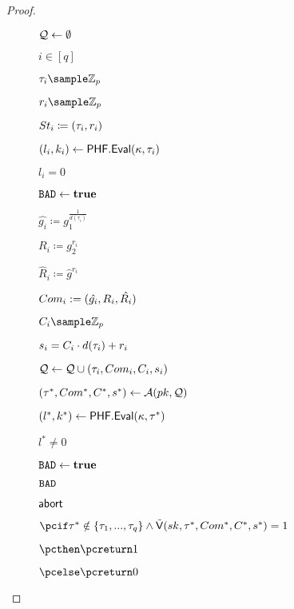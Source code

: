 \begin{proof}
\begin{figure}[htb!]
{\begin{minipage}{1\textwidth}
\begin{nicodemus}
		\item $\mathcal{Q} \leftarrow \emptyset$
                \item \pcfor $i \in [q]$
                \item \quad $ \tau_i \sample \mathbb{Z}_p$
                \hfill{}
                \item  \quad $r_i \sample \mathbb{Z}_p$
                \item  \quad $St_i \coloneqq (\tau_i,r_i )$
                \item \quad $(l_i,k_i) \leftarrow \mathsf{PHF}.\mathsf{Eval}(\kappa,\tau_i)$
                \hfill{}
                \item \quad \pcif $l_i = 0$
                \hfill{}
                \item \quad \quad \pcthen $\texttt{BAD} \leftarrow \textbf{true}$
                \hfill{}
                \item \quad  $\hat{g_i} \coloneqq g_1^{\frac{1}{d(\tau_i)}}$
                \item \quad  $R_i \coloneqq g_2^{r_i}$
                \item  \quad $\hat{R}_i \coloneqq \hat{g}^{r_i}$
                \item  \quad $Com_i := (\hat{g_i},R_i,\hat{R_i})$
                \item \quad $ \c_i \sample \mathbb{Z}_p$
                \item \quad $s_i = C_i\cdot d(\tau_i) + r_i$
                \item \quad $\mathcal{Q} \leftarrow \mathcal{Q} \cup (\tau_i,Com_i,C_i,s_i) $
                \item $(\tau^*, Com^*,C^*,s^*)\gets\mathcal{A}(pk,\mathcal{Q})$
                 \item \quad $(l^*,k^*) \leftarrow \mathsf{PHF}.\mathsf{Eval}(\kappa,\tau^*)$
                \hfill{}
                \item \quad \pcif $l^* \neq 0$
                \hfill{}
                \item \quad \quad \pcthen $\texttt{BAD} \leftarrow \textbf{true}$
                \hfill{}
        
                \item \quad \pcif $\texttt{BAD}$
                \hfill{}
                \item \quad \quad \pcthen $\mathsf{abort}$
                \hfill{}

                \item $\pcif \tau^* \notin \{\tau_1,...,\tau_q\} \land \IDAltV(\sk, \tau^*, \com^*,\c^*,\s^*) = 1$
                \item $\pcthen \pcreturn 1$
                \item $\pcelse \pcreturn 0$


\end{nicodemus}
\end{minipage}}
\end{figure}
\end{proof}
